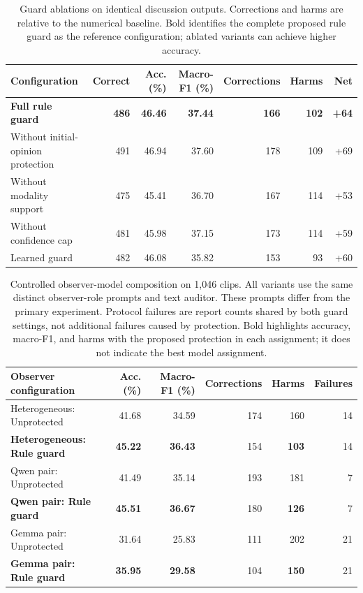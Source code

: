 \documentclass[a4paper]{article}
\begin{document}
\clearpage
\begin{table}[htbp]
\caption{Guard ablations on identical discussion outputs. Corrections and harms are relative to the numerical baseline. Bold identifies the complete proposed rule guard as the reference configuration; ablated variants can achieve higher accuracy.}
\label{tab:results_ablation}
\centering\small
\begin{tabular}{@{}lrrrrrr@{}}
\toprule
Configuration & Correct & Acc. (\%) & Macro-F1 (\%) & Corrections & Harms & Net \\
\midrule
\textbf{Full rule guard} & \textbf{486} & \textbf{46.46} & \textbf{37.44} & \textbf{166} & \textbf{102} & \textbf{+64} \\
Without initial-opinion protection & 491 & 46.94 & 37.60 & 178 & 109 & +69 \\
Without modality support & 475 & 45.41 & 36.70 & 167 & 114 & +53 \\
Without confidence cap & 481 & 45.98 & 37.15 & 173 & 114 & +59 \\
Learned guard & 482 & 46.08 & 35.82 & 153 & 93 & +60 \\
\bottomrule
\end{tabular}
\end{table}

\clearpage
\begin{table}[htbp]
\caption{Controlled observer-model composition on 1,046 clips. All variants use the same distinct observer-role prompts and text auditor. These prompts differ from the primary experiment. Protocol failures are report counts shared by both guard settings, not additional failures caused by protection. Bold highlights accuracy, macro-F1, and harms with the proposed protection in each assignment; it does not indicate the best model assignment.}
\label{tab:model_composition}
\centering\small
\begin{tabular}{@{}lrrrrr@{}}
\toprule
Observer configuration & Acc. (\%) & Macro-F1 (\%) & Corrections & Harms & Failures \\
\midrule
Heterogeneous: Unprotected & 41.68 & 34.59 & 174 & 160 & 14 \\
\textbf{Heterogeneous: Rule guard} & \textbf{45.22} & \textbf{36.43} & 154 & \textbf{103} & 14 \\
Qwen pair: Unprotected & 41.49 & 35.14 & 193 & 181 & 7 \\
\textbf{Qwen pair: Rule guard} & \textbf{45.51} & \textbf{36.67} & 180 & \textbf{126} & 7 \\
Gemma pair: Unprotected & 31.64 & 25.83 & 111 & 202 & 21 \\
\textbf{Gemma pair: Rule guard} & \textbf{35.95} & \textbf{29.58} & 104 & \textbf{150} & 21 \\
\bottomrule
\end{tabular}
\end{table}
\end{document}
